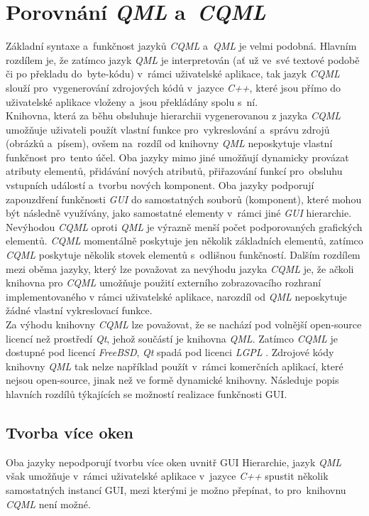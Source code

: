 \documentclass[11pt,twoside,a4paper]{book}
\begin{document}
\section{Porovnání \textit{QML} a~\textit{CQML}}
Základní syntaxe a~funkčnost jazyků \textit{CQML} a~\textit{QML} je velmi podobná. Hlavním rozdílem je, že zatímco jazyk \textit{QML} je interpretován (ať už ve~své textové podobě či po překladu do~byte-kódu) v~rámci uživatelské aplikace, tak jazyk \textit{CQML} slouží pro~vygenerování zdrojových kódů v~jazyce \textit{C++}, které jsou přímo do uživatelské aplikace vloženy a~jsou překládány spolu s~ní.\\
Knihovna, která za běhu obsluhuje hierarchii vygenerovanou z jazyka \textit{CQML} umožňuje uživateli použít vlastní funkce pro~vykreslování a~správu zdrojů (obrázků a~písem), ovšem na~rozdíl od knihovny \textit{QML} neposkytuje vlastní funkčnost pro~tento účel.
Oba jazyky mimo jiné umožňují dynamicky provázat atributy elementů, přidávání nových atributů, přiřazování funkcí pro~obsluhu vstupních událostí a~tvorbu nových komponent. Oba jazyky podporují zapouzdření funkčnosti \textit{GUI} do samostatných souborů (komponent), které mohou být následně využívány, jako samostatné elementy v~rámci jiné \textit{GUI} hierarchie.\\
Nevýhodou \textit{CQML} oproti \textit{QML} je výrazně menší počet podporovaných grafických elementů. \textit{CQML} momentálně poskytuje jen několik základních elementů, zatímco \textit{CQML} poskytuje několik stovek elementů s~odlišnou funkčností. Dalším rozdílem mezi oběma jazyky, který lze považovat za nevýhodu jazyka \textit{CQML} je, že ačkoli knihovna pro \textit{CQML} umožňuje použití externího zobrazovacího rozhraní implementovaného v rámci uživatelské aplikace, narozdíl od \textit{QML} neposkytuje žádné vlastní vykreslovací funkce. \\
Za výhodu knihovny \textit{CQML} lze považovat, že se nachází pod volnější open-source licencí než prostředí \textit{Qt}, jehož součástí je knihovna \textit{QML}. Zatímco \textit{CQML} je dostupné pod licencí \textit{FreeBSD}, \textit{Qt} spadá pod licenci \textit{LGPL} \cite{bib:Qlicense}. Zdrojové kódy knihovny \textit{QML} tak nelze například použít v~rámci komerčních aplikací, které nejsou open-source, jinak než ve formě dynamické knihovny.
Následuje popis hlavních rozdílů týkajících se možností realizace funkčnosti GUI.
\subsection{Tvorba více oken}
Oba jazyky nepodporují tvorbu více oken uvnitř GUI Hierarchie, jazyk \textit{QML} však umožňuje v~rámci uživatelské aplikace v~jazyce \textit{C++} spustit několik samostatných instancí GUI, mezi kterými je možno přepínat, to pro~knihovnu \textit{CQML} není možné.
\end{document}
